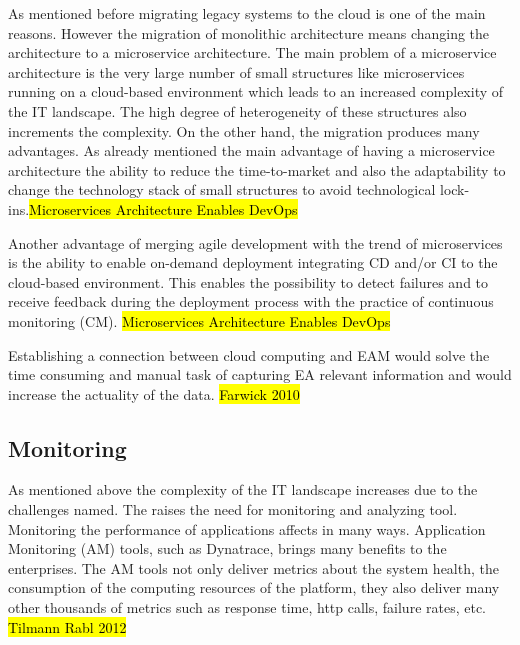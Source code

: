 As mentioned before migrating legacy systems to the cloud is one of the main reasons. However the migration of monolithic architecture means changing the architecture to a microservice architecture. The main problem of a microservice architecture is the very large number of small structures like microservices running on a cloud-based environment which leads to an increased complexity of the IT landscape. The high degree of heterogeneity of these structures also increments the complexity.
On the other hand, the migration produces many advantages.
As already mentioned the main advantage of having a microservice architecture the ability to reduce the time-to-market and also the adaptability to change the technology stack of small structures to avoid technological lock-ins.\hl{Microservices Architecture Enables DevOps}

Another advantage of merging agile development with the trend of microservices is the ability to enable on-demand deployment integrating CD and/or CI to the cloud-based environment. This enables the possibility to detect failures and to receive feedback during the deployment process with the practice of continuous monitoring (CM). \hl{Microservices Architecture Enables DevOps}

Establishing a connection between cloud computing and EAM would solve the time consuming and manual task of capturing EA relevant information and would increase the actuality of the data. \hl{Farwick 2010}

\subsection{Monitoring}

As mentioned above the complexity of the IT landscape increases due to the challenges named. The raises the need for monitoring and analyzing tool. Monitoring the performance of applications affects in many ways. Application Monitoring (AM) tools, such as Dynatrace, brings many benefits to the enterprises. The AM tools not only deliver metrics about the system health, the consumption of the computing resources of the platform, they also deliver many other thousands of metrics such as response time, http calls, failure rates, etc. \hl{Tilmann Rabl 2012}

